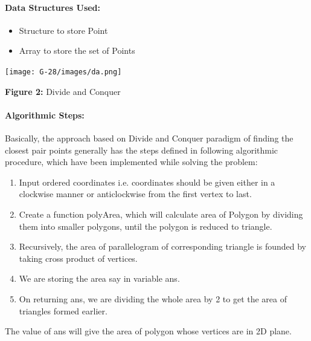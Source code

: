 \documentclass[10pt]{article}
\begin{document}
\begin{multicols*}{2}
\paragraph{Data Structures Used:}

\begin{itemize}
\item	Structure to store Point
\item	Array to store the set of Points
\end{itemize}

\texttt{[image: G-28/images/da.png]}\begin{center}\textbf{Figure 2:} Divide and Conquer\end{center}

\paragraph{Algorithmic Steps:}

Basically, the approach based on Divide and Conquer paradigm of finding the closest pair points generally has the steps defined in following algorithmic procedure, which have been implemented while solving the problem:
\begin{enumerate}

\item	Input ordered coordinates i.e. coordinates should be given either in a clockwise manner or anticlockwise from the first vertex to last.
\item	Create a function polyArea, which will calculate area of Polygon by dividing them into smaller polygons, until the polygon is reduced to triangle.
\item	Recursively, the area of parallelogram of corresponding triangle is founded by taking cross product of vertices. 
\item	We are storing the area say in variable ans.
\item	On returning ans, we are dividing the whole area by 2 to get the area of triangles formed earlier. 

\end{enumerate}

The value of ans will give the area of polygon whose vertices are in 2D plane.



\begin{lstlisting}




\end{lstlisting}
\end{multicols*}
\end{document}
